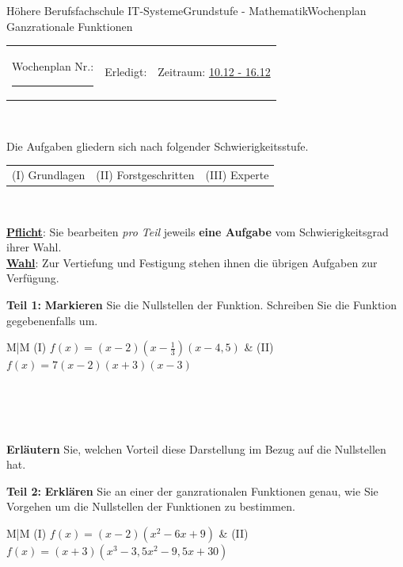 \documentclass[oneside,openany,headings=optiontotoc,11pt,numbers=noenddot]{scrreprt}
\begin{document}
	\begin{worksheet}{Höhere Berufsfachschule IT-Systeme}{Grundstufe - Mathematik}{Wochenplan Ganzrationale Funktionen}
		\noindent
		\begin{tabularx}{\textwidth}{XXl}
			Wochenplan Nr.: \rule{0.15\textwidth}{1pt} & Erledigt: & Zeitraum: \underline{10.12 - 16.12}
		\end{tabularx}\\
		\par\noindent
		Die Aufgaben gliedern sich nach folgender Schwierigkeitsstufe.\\
		\begin{tabularx}{\textwidth}{XXX}
			(I) Grundlagen & (II) Forstgeschritten & (III) Experte
		\end{tabularx}\\
		\par\noindent
		\textbf{\underline{Pflicht}}: Sie bearbeiten \textit{pro Teil} jeweils \textbf{eine Aufgabe} vom Schwierigkeitsgrad ihrer Wahl.\\
		\underline{\textbf{Wahl}}: Zur Vertiefung und Festigung stehen ihnen die übrigen Aufgaben zur Verfügung.
		\begin{framed}
			\noindent
			\textbf{Teil 1:} \textbf{Markieren} Sie die Nullstellen der Funktion. Schreiben Sie die Funktion gegebenenfalls um.\\
			\par\noindent
			\begin{tabularx}{\textwidth}{M|M}
				(I) \(f(x) = (x-2)(x-\frac{1}{3})(x-4,5)\) & (II) \(f(x) = 7(x-2)(x+3)(x-3)\)\\
				\\
				\hline
				\\
			\end{tabularx}\\
			\par\bigskip\noindent
			\textbf{Erläutern} Sie, welchen Vorteil diese Darstellung im Bezug auf die Nullstellen hat.
		\end{framed}
		\begin{framed}
			\noindent
			\textbf{Teil 2:} \textbf{Erklären} Sie an einer der ganzrationalen Funktionen genau, wie Sie Vorgehen um die Nullstellen der Funktionen zu bestimmen.\\
			\par\noindent
			\begin{tabularx}{\textwidth}{M|M}
				(I) \(f(x) = (x-2)(x^2 - 6x + 9)\) & (II) \(f(x) = (x+3)(x^3-3,5x^2 - 9,5x +30)\)\\

\end{tabularx}
\end{framed}
\end{worksheet}
\end{document}
